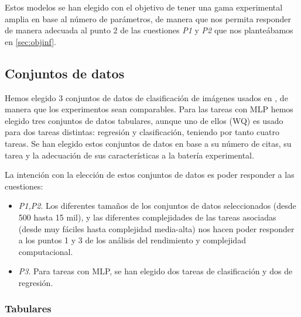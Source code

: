 Estos modelos se han elegido con el objetivo de tener una gama experimental amplia en base al número de parámetros, de manera que nos permita responder de manera adecuada al punto 2 de las cuestiones \textit{P1} y \textit{P2} que nos planteábamos en \ref{sec:objinf}. 


\subsection{Conjuntos de datos} \label{sec:conjuntos_de_datos}

Hemos elegido 3 conjuntos de datos de clasificación de imágenes usados en \cite{MHtrainingClase}, de manera que los experimentos sean comparables. Para las tareas con MLP hemos elegido tres conjuntos de datos tabulares, aunque uno de ellos (WQ) es usado para dos tareas distintas: regresión y clasificación, teniendo por tanto cuatro tareas. Se han elegido estos conjuntos de datos en base a su número de citas, su tarea y la adecuación de sus características a la batería experimental.

La intención con la elección de estos conjuntos de datos es poder responder a las cuestiones:

\begin{itemize}

\item \textit{P1,P2}. Los diferentes tamaños de los conjuntos de datos seleccionados (desde 500 hasta 15 mil), y las diferentes complejidades de las tareas asociadas (desde muy fáciles hasta complejidad media-alta) nos hacen poder responder a los puntos 1 y 3 de los análisis del rendimiento y complejidad computacional.

\item \textit{P3}. Para tareas con MLP, se han elegido dos tareas de clasificación y dos de regresión.

\end{itemize} 







\subsubsection{Tabulares}

